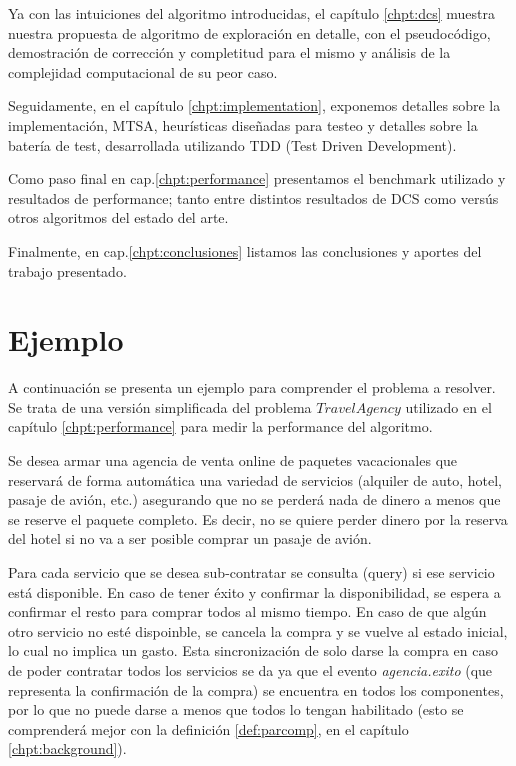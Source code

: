 Ya con las intuiciones del algoritmo introducidas, el capítulo \ref{chpt:dcs} muestra nuestra propuesta de algoritmo de exploración en detalle, con el pseudocódigo, demostración de corrección y completitud para el mismo y análisis de la complejidad computacional de su peor caso.

Seguidamente, en el capítulo \ref{chpt:implementation}, exponemos detalles sobre la implementación, MTSA, heurísticas diseñadas para testeo y detalles sobre la batería de test, desarrollada utilizando TDD (Test Driven Development).

Como paso final en cap.\ref{chpt:performance} presentamos el benchmark utilizado y resultados de performance; tanto entre distintos resultados de DCS como versús otros algoritmos del estado del arte.

Finalmente, en cap.\ref{chpt:conclusiones} listamos las conclusiones y aportes del trabajo presentado.


\section{Ejemplo}\label{chpt:casoAviones}
A continuación se presenta un ejemplo para comprender el problema a resolver. Se trata de una versión simplificada del problema $Travel Agency$ utilizado en el capítulo \ref{chpt:performance} para medir la performance del algoritmo.

Se desea armar una agencia de venta online de paquetes vacacionales que reservará de forma automática una variedad de servicios (alquiler de auto, hotel, pasaje de avión, etc.) asegurando que no se perderá nada de dinero a menos que se reserve el paquete completo. Es decir, no se quiere perder dinero por la reserva del hotel si no va a ser posible comprar un pasaje de avión.

Para cada servicio que se desea sub-contratar se consulta (query) si ese servicio está disponible. En caso de tener éxito y confirmar la disponibilidad, se espera a confirmar el resto para comprar todos al  mismo tiempo. En caso de que algún otro servicio no esté dispoinble, se cancela la compra y se vuelve al estado inicial, lo cual no implica un gasto. Esta sincronización de solo darse la compra en caso de poder contratar todos los servicios se da ya que el evento \textit{agencia.exito} (que representa la confirmación de la compra) se encuentra en todos los componentes, por lo que no puede darse a menos que todos lo tengan habilitado (esto se comprenderá mejor con la definición \ref{def:parcomp}, en el capítulo \ref{chpt:background}).

